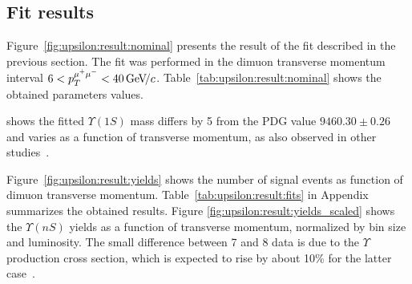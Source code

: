 \subsection{Fit results}
\label{sec:upsilon:result}

Figure~\ref{fig:upsilon:result:nominal} presents the result of the fit 
described in the previous section. The fit was performed in the dimuon
transverse momentum interval $ 6 < p_T^{\mu^+\mu^-} < 40 {\mathrm{\,Ge\kern -0.1em V\!/}c}$.
Table~\ref{tab:upsilon:result:nominal} shows the obtained parameters values. 







% 


 shows  the fitted $\Upsilon(1S)$
mass differs by 5 \mevcc from the PDG value $9460.30 \pm  0.26$ \mevcc and
varies as a function of transverse momentum, as also observed in other
studies~\cite{Aaij:2013yaa}. 

Figure~\ref{fig:upsilon:result:yields} shows the number of signal events as
function of dimuon transverse momentum. Table~\ref{tab:upsilon:result:fits} in
Appendix summarizes the obtained results. Figure
\ref{fig:upsilon:result:yields_scaled} shows the $\Upsilon(nS)$ yields as a
function of transverse momentum, normalized by bin size and luminosity. The
small difference between 7 and 8 \tev data is due to the $\Upsilon$ production
cross section, which is expected to rise by about 10\% for the latter
case~\cite{LHCb-PAPER-2011-036,Aaij:2013yaa}.




